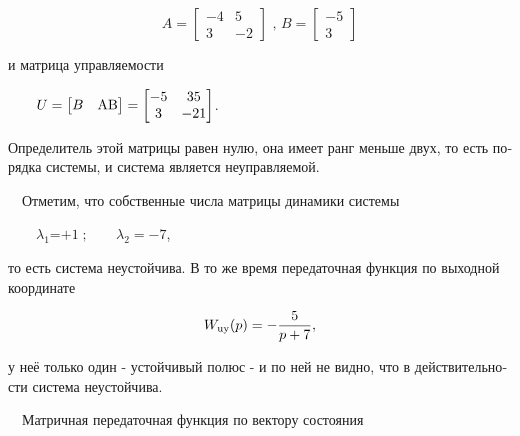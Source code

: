 \documentclass[a4paper]{article}
\newcommand\normalsubformula[1]{\text{\mathversion{normal}$#1$}}
\begin{document}
\begin{equation*}
A=\left[\begin{matrix}-4&5\\3&-2\end{matrix}\right]\text{ ,   }B=\left[\begin{matrix}-5\\3\end{matrix}\right]
\end{equation*}
{\begin{russian}\sffamily
и матрица управляемости
\end{russian}}

{\begin{russian}\sffamily
\ \ \ \ 
$U=\left[\begin{matrix}B&\normalsubformula{\text{AB}}\end{matrix}\right]=\left[\begin{matrix}-5&35\\3&-21\end{matrix}\right]$.
\end{russian}}

{\begin{russian}\sffamily
Определитель этой матрицы равен нулю, она имеет ранг меньше двух, то есть порядка системы, и система является
неуправляемой. 
\end{russian}}

{\begin{russian}\sffamily
\ \ Отметим, что собственные числа матрицы динамики системы 
\end{russian}}

{\begin{russian}\sffamily
\ \ \ \  $λ_1\text{=+}1\;;\;\;\;\;\;\;\;λ_2=-7$,
\end{russian}}

{\begin{russian}\sffamily
то есть система неустойчива. В то же время передаточная функция по выходной координате
\end{russian}}

\begin{equation*}
W_{\normalsubformula{\text{uy}}}(p)=-\frac 5{p+7},
\end{equation*}
{\begin{russian}\sffamily
у неё только один - устойчивый полюс - и по ней не видно, что в действительности система неустойчива.
\end{russian}}

{\begin{russian}\sffamily
\ \ Матричная передаточная функция по вектору состояния
\end{russian}}
\end{document}
